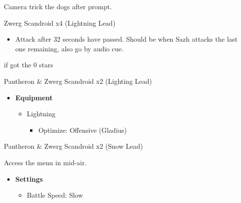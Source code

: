 \begin{multicols}{2}
  Camera trick the dogs after prompt.

  \begin{battle}[0:32]{Zwerg Scandroid x4 (Lightning Lead)}
    \begin{itemize}
      \item Attack after 32 seconds have passed. Should be when Sazh attacks the last one remaining, also go by audio cue.
    \end{itemize}
     if got the 0 stars
  \end{battle}


  \begin{battle}[0:14]{Pantheron \& Zwerg Scandroid x2 (Lighting Lead)}
  \end{battle}


  \begin{menu}
    \begin{itemize}
      \item \textbf{Equipment}
            \begin{itemize}
              \item Lightning
                    \begin{itemize}
                      \item Optimize: Offensive (Gladius)
                    \end{itemize}
            \end{itemize}
    \end{itemize}
  \end{menu}

  \begin{battle}[0:14]{Pantheron \& Zwerg Scandroid x2 (Snow Lead)}
  \end{battle}
  Access the menu in mid-air.

  \begin{menu}
    \begin{itemize}
      \item \textbf{Settings}
            \begin{itemize}
              \item Battle Speed: Slow
            \end{itemize}
    \end{itemize}
  \end{menu}


\end{multicols}
